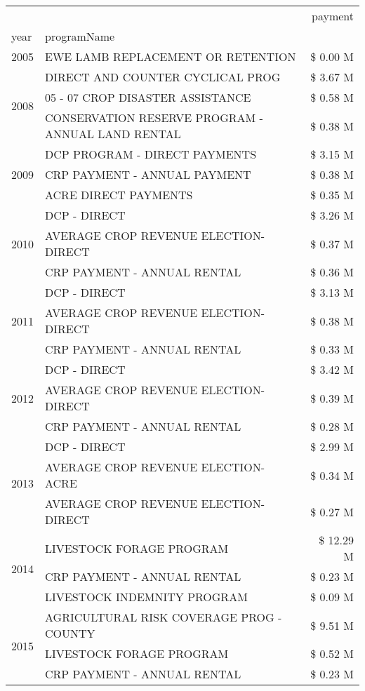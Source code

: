 \begin{tabular}{llr}
\toprule
 &  & payment \\
year & programName &  \\
\midrule
2005 & EWE LAMB REPLACEMENT OR RETENTION & \$ 0.00 M \\
\cline{1-3}
\multirow[t]{3}{*}{2008} & DIRECT AND COUNTER CYCLICAL PROG & \$ 3.67 M \\
 & 05 - 07 CROP DISASTER ASSISTANCE & \$ 0.58 M \\
 & CONSERVATION RESERVE PROGRAM - ANNUAL LAND RENTAL & \$ 0.38 M \\
\cline{1-3}
\multirow[t]{3}{*}{2009} & DCP PROGRAM - DIRECT PAYMENTS & \$ 3.15 M \\
 & CRP PAYMENT - ANNUAL PAYMENT & \$ 0.38 M \\
 & ACRE DIRECT PAYMENTS & \$ 0.35 M \\
\cline{1-3}
\multirow[t]{3}{*}{2010} & DCP - DIRECT & \$ 3.26 M \\
 & AVERAGE CROP REVENUE ELECTION-DIRECT & \$ 0.37 M \\
 & CRP PAYMENT - ANNUAL RENTAL & \$ 0.36 M \\
\cline{1-3}
\multirow[t]{3}{*}{2011} & DCP - DIRECT & \$ 3.13 M \\
 & AVERAGE CROP REVENUE ELECTION-DIRECT & \$ 0.38 M \\
 & CRP PAYMENT - ANNUAL RENTAL & \$ 0.33 M \\
\cline{1-3}
\multirow[t]{3}{*}{2012} & DCP - DIRECT & \$ 3.42 M \\
 & AVERAGE CROP REVENUE ELECTION-DIRECT & \$ 0.39 M \\
 & CRP PAYMENT - ANNUAL RENTAL & \$ 0.28 M \\
\cline{1-3}
\multirow[t]{3}{*}{2013} & DCP - DIRECT & \$ 2.99 M \\
 & AVERAGE CROP REVENUE ELECTION-ACRE & \$ 0.34 M \\
 & AVERAGE CROP REVENUE ELECTION-DIRECT & \$ 0.27 M \\
\cline{1-3}
\multirow[t]{3}{*}{2014} & LIVESTOCK FORAGE PROGRAM & \$ 12.29 M \\
 & CRP PAYMENT - ANNUAL RENTAL & \$ 0.23 M \\
 & LIVESTOCK INDEMNITY PROGRAM & \$ 0.09 M \\
\cline{1-3}
\multirow[t]{3}{*}{2015} & AGRICULTURAL RISK COVERAGE PROG - COUNTY & \$ 9.51 M \\
 & LIVESTOCK FORAGE PROGRAM & \$ 0.52 M \\
 & CRP PAYMENT - ANNUAL RENTAL & \$ 0.23 M \\

\end{tabular}
